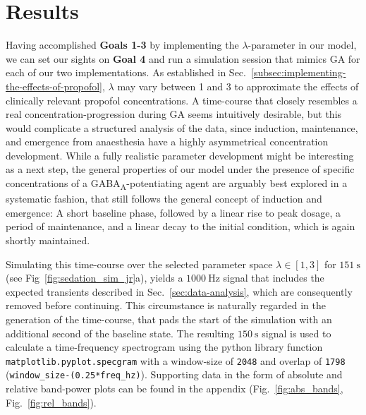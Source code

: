\chapter{Results}\label{ch:results}
Having accomplished \textbf{Goals 1-3} by implementing the $\lambda$-parameter in our model,
we can set our sights on \textbf{Goal 4} and run a simulation session that mimics GA for each of our two implementations.
As established in Sec.~\ref{subsec:implementing-the-effects-of-propofol},
$\lambda$ may vary between 1 and 3 to approximate the effects of clinically relevant propofol concentrations.
A time-course that closely resembles a real concentration-progression during GA seems intuitively desirable,
but this would complicate a structured analysis of the data,
since induction, maintenance, and emergence from anaesthesia
have a highly asymmetrical concentration development.
While a fully realistic parameter development might be interesting as a next step,
the general properties of our model under the presence of specific
concentrations of a GABA\textsubscript{A}-potentiating agent
are arguably best explored in a systematic fashion, that still follows the general concept of induction and emergence:
A short baseline phase, followed by a linear rise to peak dosage,
a period of maintenance, and a linear decay to the initial condition,
which is again shortly maintained.


Simulating this time-course over the selected parameter space
$ \lambda \in \left[ 1, 3 \right] $ for $\SI{151}{\second}$ (see Fig~\ref{fig:sedation_sim_jr}a),
yields a $\SI{1000}{\hertz}$ signal that includes the expected transients described in Sec.~\ref{sec:data-analysis},
which are consequently removed before continuing.
This circumstance is naturally regarded in the generation of the time-course,
that pads the start of the simulation with an additional second of the baseline state.
The resulting $\SI{150}{\second}$ signal is used to calculate a time-frequency spectrogram
using the python library function \texttt{matplotlib.pyplot.specgram} with a window-size of \texttt{2048}
and overlap of \texttt{1798} (\texttt{window\_size-(0.25*freq\_hz)}).
Supporting data in the form of absolute and relative band-power plots can be found in the appendix
(Fig.~\ref{fig:abs_bands}, Fig.~\ref{fig:rel_bands}).
\newtoggle{drawLocRoc}

